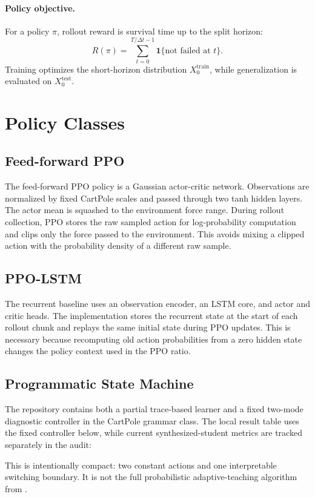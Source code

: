 \documentclass[letterpaper,twocolumn,10pt]{article}
\newcommand{\dt}{\Delta t}
\newcommand{\train}{\mathrm{train}}
\newcommand{\test}{\mathrm{test}}
\begin{document}
\paragraph{Policy objective.}
For a policy $\pi$, rollout reward is survival time up to the split horizon:
\[
    R(\pi) = \sum_{t=0}^{T/\dt - 1} \mathbf{1}\{\text{not failed at } t\}.
\]
Training optimizes the short-horizon distribution $X_0^\train$, while
generalization is evaluated on $X_0^\test$.

\section{Policy Classes}

\subsection{Feed-forward PPO}

The feed-forward PPO policy is a Gaussian actor-critic network.  Observations
are normalized by fixed CartPole scales and passed through two tanh hidden
layers.  The actor mean is squashed to the environment force range.  During
rollout collection, PPO stores the raw sampled action for log-probability
computation and clips only the force passed to the environment.  This avoids
mixing a clipped action with the probability density of a different raw sample.

\subsection{PPO-LSTM}

The recurrent baseline uses an observation encoder, an LSTM core, and actor and
critic heads.  The implementation stores the recurrent state at the start of
each rollout chunk and replays the same initial state during PPO updates.  This
is necessary because recomputing old action probabilities from a zero hidden
state changes the policy context used in the PPO ratio.

\subsection{Programmatic State Machine}

The repository contains both a partial trace-based learner and a fixed
two-mode diagnostic controller in the CartPole grammar class.  The local result
table uses the fixed controller below, while current synthesized-student
metrics are tracked separately in the audit:

This is intentionally compact: two constant actions and one interpretable
switching boundary.  It is not the full probabilistic adaptive-teaching
algorithm from \citet{inala2020sppig}.
\end{document}
